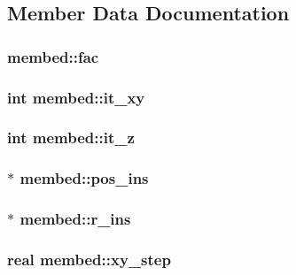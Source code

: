 \subsection{\-Member \-Data \-Documentation}
\hypertarget{structmembed_a16587fafef1debdd3d4879c10128b7a5}{
\subsubsection[{fac}]{ {\bf membed\-::fac}}}\label{structmembed_a16587fafef1debdd3d4879c10128b7a5}
\hypertarget{structmembed_aa5099ca07e417297ec3aa3d68a998da2}{
\subsubsection[{it\-\_\-xy}]{\setlength{\rightskip}{0pt plus 5cm}int {\bf membed\-::it\-\_\-xy}}}\label{structmembed_aa5099ca07e417297ec3aa3d68a998da2}
\hypertarget{structmembed_aedf1e94b250e6843887106c0f6cf6a99}{
\subsubsection[{it\-\_\-z}]{\setlength{\rightskip}{0pt plus 5cm}int {\bf membed\-::it\-\_\-z}}}\label{structmembed_aedf1e94b250e6843887106c0f6cf6a99}
\hypertarget{structmembed_a25ce07ed6f469fcc937f8c331671ca99}{
\subsubsection[{pos\-\_\-ins}]{$\ast$ {\bf membed\-::pos\-\_\-ins}}}\label{structmembed_a25ce07ed6f469fcc937f8c331671ca99}
\hypertarget{structmembed_ad34a45ba96abbe44013dabe086a2f6ab}{
\subsubsection[{r\-\_\-ins}]{$\ast$ {\bf membed\-::r\-\_\-ins}}}\label{structmembed_ad34a45ba96abbe44013dabe086a2f6ab}
\hypertarget{structmembed_a02aaf614c85b3fca2bb52ae4d3ae5738}{
\subsubsection[{xy\-\_\-step}]{\setlength{\rightskip}{0pt plus 5cm}real {\bf membed\-::xy\-\_\-step}}}\label{structmembed_a02aaf614c85b3fca2bb52ae4d3ae5738}
